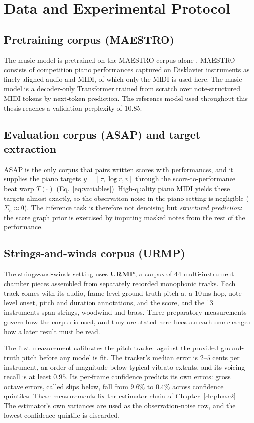 \chapter{Data and Experimental Protocol}\label{ch:data}

\section{Pretraining corpus (MAESTRO)}
The music model is pretrained on the MAESTRO corpus alone \cite{maestro}.
MAESTRO consists of competition piano performances captured on Disklavier
instruments as finely aligned audio and MIDI, of which only the MIDI is used
here. The music model is a decoder-only Transformer trained from scratch over
note-structured MIDI tokens by next-token prediction. The reference model used
throughout this thesis reaches a validation perplexity of $10.85$.

\section{Evaluation corpus (ASAP) and target extraction}
ASAP \cite{asap} is the only corpus that pairs written scores with
performances, and it supplies the piano targets $y = [\tau, \log r, v]$
through the score-to-performance beat warp $T(\cdot)$ (Eq.~\ref{eq:variables}).
High-quality piano MIDI yields these targets almost exactly, so the
observation noise in the piano setting is negligible ($\Sigma_e \approx 0$).
The inference task is therefore not denoising but \emph{structured
prediction}: the score graph prior is exercised by imputing masked notes from
the rest of the performance.

\section{Strings-and-winds corpus (URMP)}\label{sec:urmp}
The strings-and-winds setting uses \textbf{URMP}, a corpus of 44
multi-instrument chamber pieces assembled from separately recorded monophonic
tracks. Each track comes with its audio, frame-level ground-truth pitch at a
10\,ms hop, note-level onset, pitch and duration annotations, and the score,
and the 13 instruments span strings, woodwind and brass. Three preparatory
measurements govern how the corpus is used, and they are stated here because
each one changes how a later result must be read.

The first measurement calibrates the pitch tracker against the provided
ground-truth pitch before any model is fit. The tracker's median error is
2--5 cents per instrument, an order of magnitude below typical vibrato
extents, and its voicing recall is at least $0.95$. Its per-frame confidence
predicts its own errors: gross octave errors, called slips below, fall from
$9.6\%$ to $0.4\%$ across confidence quintiles. These measurements fix the
estimator chain of Chapter~\ref{ch:phase2}. The estimator's own variances are
used as the observation-noise row, and the lowest confidence quintile is
discarded.

